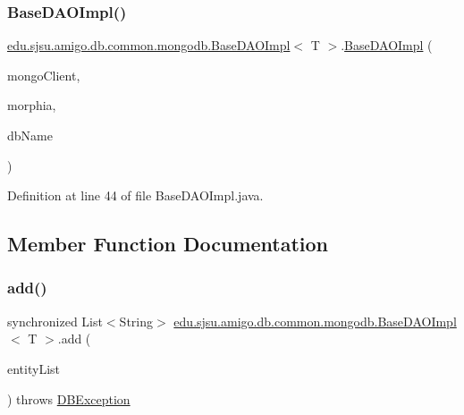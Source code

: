 \subsubsection{\texorpdfstring{Base\+D\+A\+O\+Impl()}{BaseDAOImpl()}}
{\footnotesize\ttfamily \hyperlink{classedu_1_1sjsu_1_1amigo_1_1db_1_1common_1_1mongodb_1_1_base_d_a_o_impl}{edu.\+sjsu.\+amigo.\+db.\+common.\+mongodb.\+Base\+D\+A\+O\+Impl}$<$ T $>$.\hyperlink{classedu_1_1sjsu_1_1amigo_1_1db_1_1common_1_1mongodb_1_1_base_d_a_o_impl}{Base\+D\+A\+O\+Impl} (\begin{DoxyParamCaption}\item[{Mongo\+Client}]{mongo\+Client,  }\item[{Morphia}]{morphia,  }\item[{String}]{db\+Name }\end{DoxyParamCaption})\hspace{0.3cm}{\ttfamily [protected]}}



Definition at line 44 of file Base\+D\+A\+O\+Impl.\+java.



\subsection{Member Function Documentation}
\mbox{\label{classedu_1_1sjsu_1_1amigo_1_1db_1_1common_1_1mongodb_1_1_base_d_a_o_impl_aa9f9296750acb9a6f356163e35157837}} 
\subsubsection{\texorpdfstring{add()}{add()}}
{\footnotesize\ttfamily synchronized List$<$String$>$ \hyperlink{classedu_1_1sjsu_1_1amigo_1_1db_1_1common_1_1mongodb_1_1_base_d_a_o_impl}{edu.\+sjsu.\+amigo.\+db.\+common.\+mongodb.\+Base\+D\+A\+O\+Impl}$<$ T $>$.add (\begin{DoxyParamCaption}\item[{List$<$ T $>$}]{entity\+List }\end{DoxyParamCaption}) throws \hyperlink{classedu_1_1sjsu_1_1amigo_1_1db_1_1common_1_1_d_b_exception}{D\+B\+Exception}}



